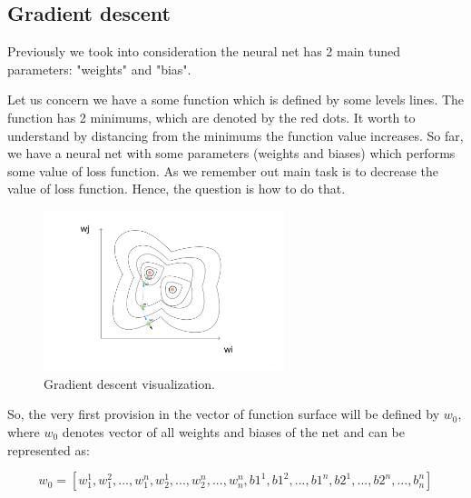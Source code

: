\documentclass{article}
\begin{document}
\subsection{Gradient descent}
Previously we took into consideration the neural net has 2 main tuned parameters: "weights" and "bias".

Let us concern we have a some function which is defined by some levels lines. The function has 2 minimums, which are denoted by the red dots.  It worth to understand by distancing from the minimums the function value increases. 
So far, we have a neural net with some parameters (weights and biases) which performs some value of loss function. As we remember out main task is to decrease the value of loss function. Hence, the question is how to do that.

\begin{figure}[h]
    \centering \includegraphics[width=7cm]{images/gradient_descent.jpg}
    \caption {Gradient descent visualization.}
\end{figure}

So, the very first provision in the vector of function surface will be defined by $w_0$, where $w_0$ denotes vector of all weights and biases of the net and can be represented as: 

\[ w_0 = [w_1^1, w_1^2,...,w_1^n, w_2^1,...,w_2^n,...,w_n^n, b1^1, b1^2,...,b1^n, b2^1,...,b2^n,...,b_n^n] \]
\end{document}
